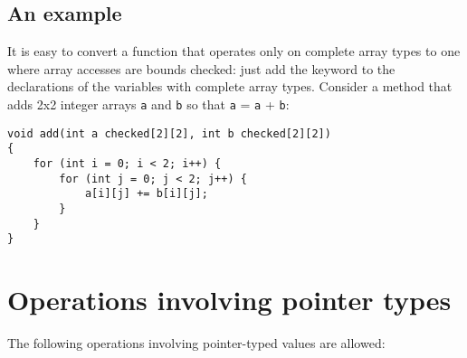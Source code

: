 \subsection{An example}

It is easy to convert a function that operates only on complete array
types to one where array accesses are bounds checked: just add the
 keyword to the declarations of the variables with complete array
types. Consider a method that adds 2x2 integer arrays \texttt{a} and
\texttt{b} so that \texttt{a} = \texttt{a} + \texttt{b}:

\begin{verbatim}
void add(int a checked[2][2], int b checked[2][2])
{
    for (int i = 0; i < 2; i++) {
        for (int j = 0; j < 2; j++) {
            a[i][j] += b[i][j];
        }
    }
}
\end{verbatim}

\section{Operations involving pointer types}

The following operations involving pointer-typed values are allowed:

